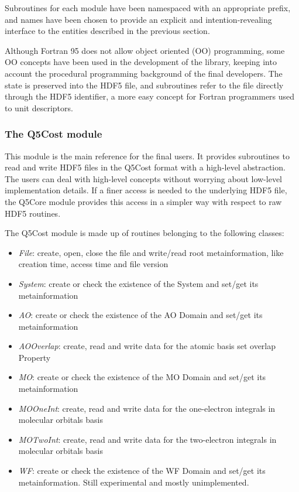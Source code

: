 Subroutines for each module have been namespaced with an appropriate prefix,
and names have been chosen to provide an explicit and {intention-revealing}
interface to the entities described in the previous section.  

Although Fortran 95 does not allow object oriented (OO) programming, some OO
concepts have been used in the development of the library, keeping into
account the procedural programming background of the final developers. The
state is preserved into the HDF5 file, and subroutines refer to the file
directly through the HDF5 identifier, a more easy concept for Fortran
programmers used to unit descriptors.

\subsubsection*{The Q5Cost module}

This module is the main reference for the final users. It provides
subroutines to read and write HDF5 files in the Q5Cost format with a high-level
abstraction. The users can deal with high-level concepts without worrying
about low-level implementation details. If a finer access is needed to the
underlying HDF5 file, the Q5Core module provides this access in a simpler
way with respect to raw HDF5 routines.

The Q5Cost module is made up of routines belonging to the following
classes:
\begin{itemize}
\item \textit{File}: create, open, close the file and write/read root
metainformation, like creation time, access time and file version
\item \textit{System}: create or check the existence of the System and set/get
its metainformation
\item \textit{AO}: create or check the existence of the AO Domain and set/get its
metainformation
\item \textit{AOOverlap}: create, read and write data for the atomic basis set
overlap Property
\item \textit{MO}: create or check the existence of the MO Domain and set/get its
metainformation
\item \textit{MOOneInt}: create, read and write data for the one-electron
integrals in molecular orbitals basis
\item \textit{MOTwoInt}: create, read and write data for the two-electron
integrals in molecular orbitals basis
\item \textit{WF}: create or check the existence of the WF Domain and set/get its
metainformation. Still experimental and mostly unimplemented.
\end{itemize}

